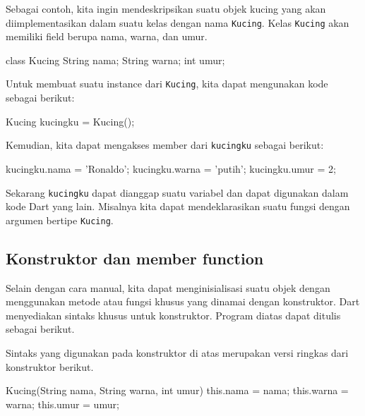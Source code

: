 \documentclass[a4paper,11pt]{article} %
\newcommand{\txtinline}[1]{\texttt{#1}}
\begin{document}
Sebagai contoh, kita ingin mendeskripsikan suatu objek kucing yang akan
diimplementasikan dalam suatu kelas dengan nama \txtinline{Kucing}.
Kelas \txtinline{Kucing} akan memiliki field berupa nama, warna, dan umur.

\begin{dartcode}
class Kucing {
  String nama;
  String warna;
  int umur;
}
\end{dartcode}

Untuk membuat suatu instance dari \txtinline{Kucing}, kita dapat mengunakan
kode sebagai berikut:
\begin{dartcode}
Kucing kucingku = Kucing();
\end{dartcode}
Kemudian, kita dapat mengakses member dari \txtinline{kucingku} sebagai
berikut:
\begin{dartcode}
kucingku.nama = 'Ronaldo';
kucingku.warna = 'putih';
kucingku.umur = 2;
\end{dartcode}

Sekarang \txtinline{kucingku} dapat dianggap suatu variabel dan dapat digunakan
dalam kode Dart yang lain. Misalnya kita dapat mendeklarasikan suatu fungsi
dengan argumen bertipe \txtinline{Kucing}.


\subsection{Konstruktor dan member function}
Selain dengan cara manual, kita dapat menginisialisasi suatu objek dengan
menggunakan metode atau fungsi khusus yang dinamai dengan konstruktor.
Dart menyediakan sintaks khusus untuk konstruktor. Program diatas dapat
ditulis sebagai berikut.

Sintaks yang digunakan pada konstruktor di atas merupakan versi ringkas
dari konstruktor berikut.
\begin{dartcode}
Kucing(String nama, String warna, int umur) {
  this.nama = nama;
  this.warna = warna;
  this.umur = umur;
}
\end{dartcode}
\end{document}
